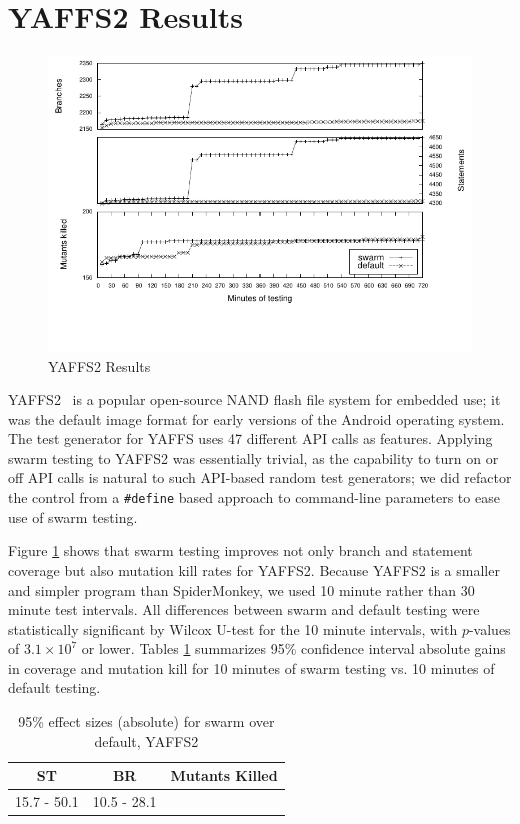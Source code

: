 \section{YAFFS2 Results}

\begin{figure}[t]
  \centering
  \includegraphics[width=\textwidth]{../graphs/yaffs2/yaffs2}
  \vspace{-1.3in}
  \caption{YAFFS2 Results}
  \label{fig:yaffs2}
\end{figure}

YAFFS2~\cite{yaffs2} is a popular open-source NAND flash file system
for embedded use; it was the default image format for early versions
of the Android operating system.  The test generator for YAFFS uses 47
different API calls as features.  Applying swarm testing to YAFFS2 was
essentially trivial, as the capability to turn on or off API calls is
natural to such API-based random test generators; we did refactor the
control from a {\tt \#define} based approach to command-line
parameters to ease use of swarm testing.

Figure \ref{fig:yaffs2} shows that swarm testing improves not only
branch and statement coverage but also mutation kill rates for YAFFS2.
Because YAFFS2 is a smaller and simpler program than SpiderMonkey, we
used 10 minute rather than 30 minute test intervals.  All differences
between swarm and default testing were statistically significant by
Wilcox U-test for the 10 minute intervals, with $p$-values of $3.1
\times 10^7$ or lower.  Tables \ref{tab:yaffseffect} summarizes 95\%
confidence interval absolute gains in coverage and mutation kill for 10 minutes of swarm testing vs. 10 minutes of default testing.

\begin{table}
\caption{95\% effect sizes (absolute) for swarm over default, YAFFS2}
\centering
\begin{tabular}{c|c|c}
\hline
ST & BR & Mutants Killed \\
\hline
\hline
15.7 - 50.1 & 10.5 - 28.1 \\
\hline
\end{tabular}

\label{tab:yaffseffect}
\end{table}
